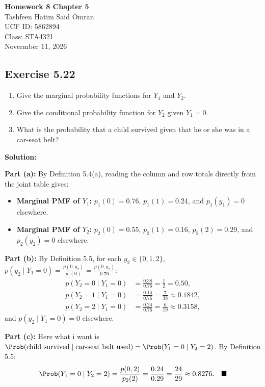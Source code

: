 \documentclass[11pt, letterpaper]{article}
\begin{document}
\begin{center}
\textbf{\Large Homework 8 Chapter 5} \\
Tashfeen Hatim Said Omran \\
UCF ID: 5862894 \\
Class: STA4321 \\
Novermber 11, 2026
\end{center}


\subsection{Exercise 5.22}
\begin{enumerate}[label=\textbf{\alph*}]
    \item Give the marginal probability functions for $Y_1$ and $Y_2$.
    \item Give the conditional probability function for $Y_2$ given $Y_1 = 0$.
    \item What is the probability that a child survived given that he or she was in a car-seat belt?
\end{enumerate}

\textbf{Solution:}

\textbf{Part (a):} By Definition 5.4(a), reading the column and row totals directly from the joint table gives:
\begin{itemize}
    \item \textbf{Marginal PMF of $Y_1$:} $p_1(0) = 0.76$, $p_1(1) = 0.24$, and $p_1(y_1) = 0$ elsewhere.
    \item \textbf{Marginal PMF of $Y_2$:} $p_2(0) = 0.55$, $p_2(1) = 0.16$, $p_2(2) = 0.29$, and $p_2(y_2) = 0$ elsewhere.
\end{itemize}

\textbf{Part (b):} By Definition 5.5, for each $y_2 \in \{0, 1, 2\}$, $p(y_2 \mid Y_1 = 0) = \frac{p(0, y_2)}{p_1(0)} = \frac{p(0, y_2)}{0.76}$:
\begin{align*}
    p(Y_2 = 0 \mid Y_1 = 0) &= \frac{0.38}{0.76} = \frac{1}{2} = 0.50, \\
    p(Y_2 = 1 \mid Y_1 = 0) &= \frac{0.14}{0.76} = \frac{7}{38} \approx 0.1842, \\
    p(Y_2 = 2 \mid Y_1 = 0) &= \frac{0.24}{0.76} = \frac{6}{19} \approx 0.3158,
\end{align*}
and $p(y_2 \mid Y_1 = 0) = 0$ elsewhere.

\textbf{Part (c):} Here what i want is$\Prob(\text{child survived} \mid \text{car-seat belt used}) = \Prob(Y_1 = 0 \mid Y_2 = 2)$. By Definition 5.5:
\[ \Prob(Y_1 = 0 \mid Y_2 = 2) = \frac{p(0, 2)}{p_2(2)} = \frac{0.24}{0.29} = \frac{24}{29} \approx 0.8276. \quad \blacksquare \]
\end{document}
